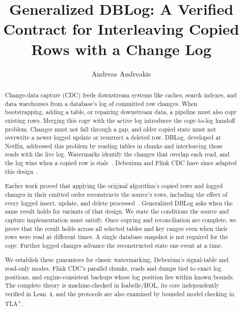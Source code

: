 \documentclass[sigconf,nonacm,10pt]{acmart}
\title{Generalized DBLog: A Verified Contract for Interleaving
Copied Rows with a Change Log}
\author{Andreas Andreakis}
\theoremstyle{plain}
\theoremstyle{definition}
\begin{document}
\begin{abstract}
Change-data capture (CDC) feeds downstream systems like caches, search
indexes, and data warehouses from a database's log of committed row changes.
When bootstrapping, adding a table, or repairing downstream data, a pipeline
must also copy existing rows. Merging this copy with the active log introduces
the copy-to-log handoff problem. Changes must not fall through a gap, and
older copied state must not overwrite a newer logged update or resurrect a
deleted row. DBLog, developed at Netflix, addressed this problem by reading
tables in chunks and interleaving those reads with the live log. Watermarks
identify the changes that overlap each read, and the log wins when a copied
row is stale~\cite{andreakis2020dblog,dblog_netflix_blog}. Debezium and Flink
CDC have since adapted this
design~\cite{debezium_incremental_snapshots,debezium_mysql_connector,flinkcdc_mysql}.

Earlier work proved that applying the original algorithm's copied rows and
logged changes in their emitted order reconstructs the source's rows, 
including the effect of every logged insert, update, and delete
processed~\cite{andreakis2026virtualcuts}. Generalized DBLog asks when the
same result holds for variants of that design. We state the conditions the
source and capture implementation must satisfy. Once copying and reconciliation 
are complete, we prove that the result holds across all selected tables
and key ranges even when their rows were read at different times. A single
database snapshot is not required for the copy. Further logged changes advance
the reconstructed state one event at a time.

We establish these guarantees for classic watermarking, Debezium's
signal-table and read-only modes, Flink CDC's parallel chunks, reads and dumps
tied to exact log positions, and engine-consistent backups whose log position
lies within known bounds.
The complete theory is machine-checked in Isabelle/HOL, its core independently
verified in Lean~4, and the protocols are also examined by bounded model
checking in TLA\textsuperscript{+}.
\end{abstract}

\end{document}
